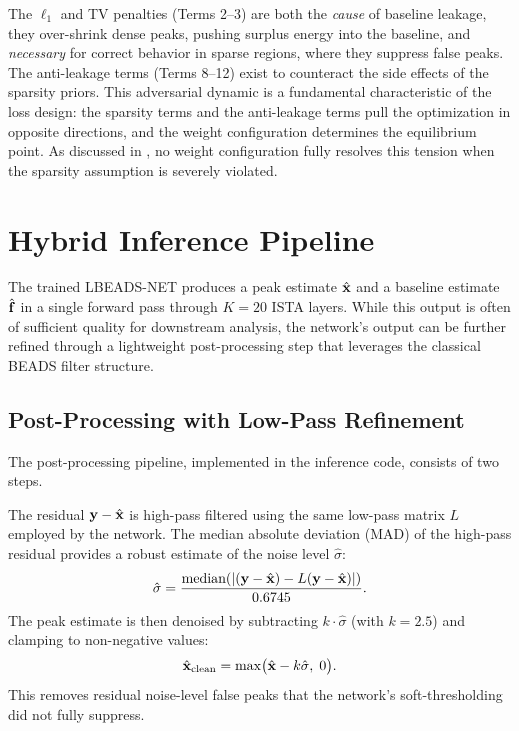 The $\ell_1$ and TV penalties (Terms 2--3) are both the \emph{cause} of baseline leakage, they over-shrink dense peaks, pushing surplus energy into the baseline, and \emph{necessary} for correct behavior in sparse regions, where they suppress false peaks. The anti-leakage terms (Terms 8--12) exist to counteract the side effects of the sparsity priors. This adversarial dynamic is a fundamental characteristic of the loss design: the sparsity terms and the anti-leakage terms pull the optimization in opposite directions, and the weight configuration determines the equilibrium point. As discussed in , no weight configuration fully resolves this tension when the sparsity assumption is severely violated.


\section{Hybrid Inference Pipeline}
\label{sec:method_hybrid}

The trained LBEADS-NET produces a peak estimate $\hat{\mathbf{x}}$ and a baseline estimate $\hat{\mathbf{f}}$ in a single forward pass through $K = 20$ ISTA layers. While this output is often of sufficient quality for downstream analysis, the network's output can be further refined through a lightweight post-processing step that leverages the classical BEADS filter structure.


\subsection{Post-Processing with Low-Pass Refinement}
\label{sec:method_postprocess}

The post-processing pipeline, implemented in the inference code, consists of two steps.

The residual $\mathbf{y} - \hat{\mathbf{x}}$ is high-pass filtered using the same low-pass matrix $L$ employed by the network. The median absolute deviation (MAD) of the high-pass residual provides a robust estimate of the noise level $\hat{\sigma}$:
\begin{equation}
    \hat{\sigma} = \frac{\text{median}(|(\mathbf{y} - \hat{\mathbf{x}}) - L(\mathbf{y} - \hat{\mathbf{x}})|)}{0.6745}.
    \label{eq:noise_estimate}
\end{equation}
The peak estimate is then denoised by subtracting $k \cdot \hat{\sigma}$ (with $k = 2.5$) and clamping to non-negative values:
\begin{equation}
    \hat{\mathbf{x}}_{\text{clean}} = \max\!\big(\hat{\mathbf{x}} - k\hat{\sigma},\; 0\big).
    \label{eq:clean_peaks}
\end{equation}
This removes residual noise-level false peaks that the network's soft-thresholding did not fully suppress.


